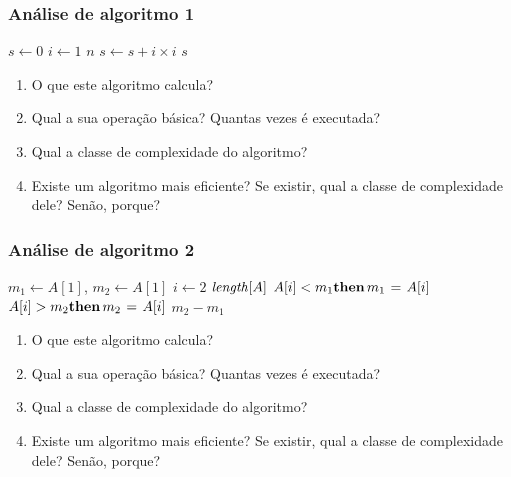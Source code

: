 \documentclass[handout]{beamer}
\begin{document}
\begin{frame}
\frametitle{Análise de algoritmo 1}

\begin{problem}
\begin{codebox}
\li $s \gets 0$
\li \For $i \gets 1$ \To $n$
\li \Do
\li   $s \gets s + i \times i$
    \End
\li \Return $s$
\end{codebox}
\begin{enumerate}
\item O que este algoritmo calcula?
\item Qual a sua operação básica? Quantas vezes é executada?
\item Qual a classe de complexidade do algoritmo?
\item Existe um algoritmo mais eficiente? Se existir, qual a classe de complexidade dele? Senão, porque?
\end{enumerate}
\end{problem}
\end{frame}

\begin{frame}
\frametitle{Análise de algoritmo 2}

\begin{problem}
\begin{codebox}
\li $m_1 \gets A[1]$, $m_2 \gets A[1]$
\li \For $i \gets 2$ \To $\id{length}[A]$
\li \Do
\li   \If $A[i] < m_1 \textbf{then}\, m_1 \mathrel{\hspace{1pt}=\hspace{1pt}} A[i]$
\li   \If $A[i] > m_2 \textbf{then}\, m_2 \mathrel{\hspace{1pt}=\hspace{1pt}} A[i]$
    \End
\li \Return $m_2 - m_1$
\end{codebox}
\begin{enumerate}
\item O que este algoritmo calcula?
\item Qual a sua operação básica? Quantas vezes é executada?
\item Qual a classe de complexidade do algoritmo?
\item Existe um algoritmo mais eficiente? Se existir, qual a classe de complexidade dele? Senão, porque?
\end{enumerate}
\end{problem}
\end{frame}
\end{document}
